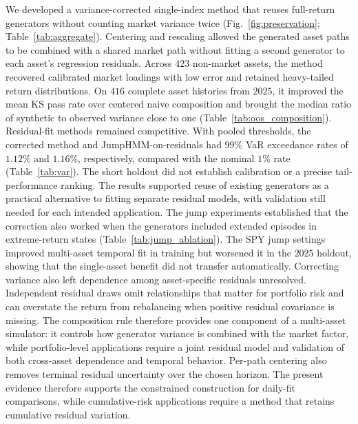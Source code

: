 We developed a variance-corrected single-index method that reuses
full-return generators without counting market variance twice (Fig.~\ref{fig:preservation};
Table~\ref{tab:aggregate}). Centering and rescaling allowed the
generated asset paths to be combined with a shared market path without
fitting a second generator to each asset's regression residuals.
Across $423$ non-market assets, the method recovered calibrated
market loadings with low error and retained heavy-tailed return
distributions. On $416$ complete asset histories from $2025$, it
improved the mean KS pass rate over centered naive composition and
brought the median ratio of synthetic to observed variance close to
one (Table~\ref{tab:oos_composition}). Residual-fit methods remained competitive. With pooled thresholds,
the corrected method and JumpHMM-on-residuals had $99\%$ VaR
exceedance rates of $1.12\%$ and $1.16\%$, respectively, compared
with the nominal $1\%$ rate (Table~\ref{tab:var}). The short holdout
did not establish calibration or a precise tail-performance ranking. The results supported reuse of existing
generators as a practical alternative to fitting separate residual
models, with validation still needed for each intended application.
The jump experiments established that the correction also worked when
the generators included extended episodes in extreme-return states
(Table~\ref{tab:jump_ablation}).
The SPY jump settings improved multi-asset temporal fit in training
but worsened it in the $2025$ holdout, showing that the single-asset
benefit did not transfer automatically. Correcting variance also left
dependence among asset-specific residuals unresolved. Independent
residual draws omit relationships that matter for portfolio risk and
can overstate the return from rebalancing when positive residual
covariance is missing. The composition rule therefore provides one
component of a multi-asset simulator: it controls how generator
variance is combined with the market factor, while portfolio-level
applications require a joint residual model and validation of both
cross-asset dependence and temporal behavior. Per-path centering also
removes terminal residual uncertainty over the chosen horizon. The
present evidence therefore supports the constrained construction for
daily-fit comparisons, while cumulative-risk applications require a
method that retains cumulative residual variation.
